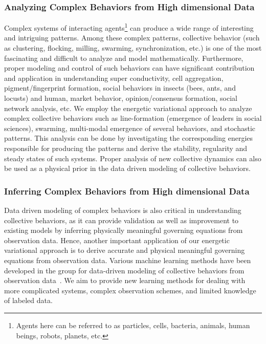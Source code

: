 \documentclass[11pt]{NSFamsart}
\begin{document}
\subsubsection*{Analyzing Complex Behaviors from High dimensional Data}
Complex systems of interacting agents\footnote{Agents here can be referred to as particles, cells, bacteria, animals, human beings, robots, planets, etc.} can produce a wide range of interesting and intriguing patterns.  Among these complex patterns, collective behavior (such as clustering, flocking, milling, swarming, synchronization, etc.) is one of the most fascinating and difficult to analyze and model mathematically.  Furthermore, proper modeling and control of such behaviors can have significant contribution and application in understanding super conductivity, cell aggregation, pigment/fingerprint formation, social behaviors in insects (bees, ants, and locusts) and human, market behavior, opinion/consensus formation, social network analysis, etc. We employ the energetic variational approach to analyze complex collective behaviors such as line-formation (emergence of leaders in social sciences), swarming, multi-modal emergence of several behaviors, and stochastic patterns.  This analysis can be done by investigating the corresponding energies responsible for producing the patterns and derive the stability, regularity and steady states of such systems.  Proper analysis of new collective dynamics can also be used as a physical prior in the data driven modeling of collective behaviors.

\subsubsection*{Inferring Complex Behaviors from High dimensional Data}
Data driven modeling of complex behaviors is also critical in understanding collective behaviors, as it can provide validation as well as improvement to existing models by inferring physically meaningful governing equations from observation data.  Hence, another important application of our energetic variational approach is to derive accurate and physical meaningful governing equations from observation data.  Various machine learning methods have been developed in the group for data-driven modeling of collective behaviors from observation data~\cite{LZTM2019, ZMM2020, MMQZ2021, FMMZ2022,MTZM2022, ZMM2023}.  We aim to provide new learning methods for dealing with more complicated systems, complex observation schemes, and limited knowledge of labeled data.
\end{document}
